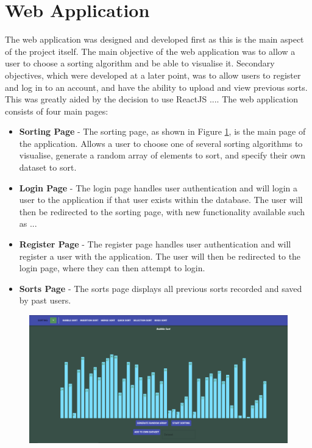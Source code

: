 \section{Web Application}
The web application was designed and developed first as this is the main aspect of the project itself. The main objective of the web application was to allow a user to choose a sorting algorithm and be able to visualise it. Secondary objectives, which were developed at a later point, was to allow users to register and log in to an account, and have the ability to upload and view previous sorts. This was greatly aided by the decision to use ReactJS .... The web application consists of four main pages: 

\begin{itemize}
    \item \textbf{Sorting Page} - The sorting page, as shown in Figure \ref{fig:main_page}, is the main page of the application. Allows a user to choose one of several sorting algorithms to visualise, generate a random array of elements to sort, and specify their own dataset to sort.
    \item \textbf{Login Page} - The login page handles user authentication and will login a user to the application if that user exists within the database. The user will then be redirected to the sorting page, with new functionality available such as ...
    \item \textbf{Register Page} - The register page handles user authentication and will register a user with the application. The user will then be redirected to the login page, where they can then attempt to login.
    \item \textbf{Sorts Page} - The sorts page displays all previous sorts recorded and saved by past users.
\end{itemize}

\begin{figure}[!h]
    \centering
    \includegraphics[scale=.4]{images/web_app_main}
    \label{fig:main_page}
\end{figure}

